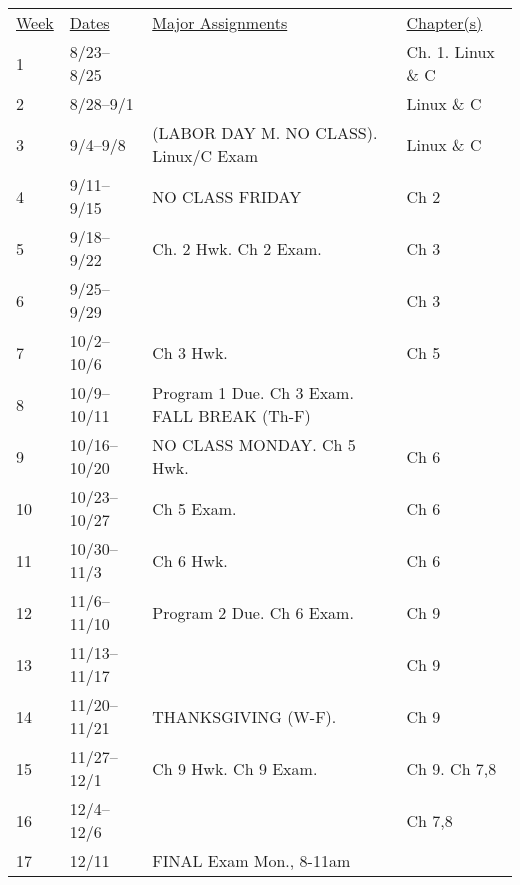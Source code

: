 \documentclass[10pt]{article}
\begin{document}
\begin{center}
\begin{tabular}{llll}
\underline{Week} & \underline{Dates} & \underline{Major Assignments} & \underline{Chapter(s)}\\
1 & 8/23--8/25  &  & Ch. 1. Linux \& C \\
2 & 8/28--9/1 &  &  Linux \& C \\
3 & 9/4--9/8 & (LABOR DAY M. NO CLASS). Linux/C Exam &  Linux \& C \\
4 & 9/11--9/15  & NO CLASS FRIDAY &  Ch 2 \\
5 & 9/18--9/22 & Ch. 2 Hwk. Ch 2 Exam. & Ch 3 \\
6 & 9/25--9/29 &  & Ch 3 \\
7 & 10/2--10/6 & Ch 3 Hwk. &  Ch 5 \\
8 & 10/9--10/11 & Program 1 Due. Ch 3 Exam. FALL BREAK (Th-F) & \\
9 & 10/16--10/20 & NO CLASS MONDAY. Ch 5 Hwk. &  Ch 6 \\
10 & 10/23--10/27  & Ch 5 Exam.  & Ch 6 \\
11 & 10/30--11/3 & Ch 6 Hwk. &  Ch 6 \\
12 & 11/6--11/10 & Program 2 Due. Ch 6 Exam.  & Ch 9 \\
13 & 11/13--11/17 &  & Ch 9 \\
14 & 11/20--11/21 & THANKSGIVING (W-F). & Ch 9 \\
15 & 11/27--12/1 & Ch 9 Hwk. Ch 9 Exam.  &  Ch 9. Ch 7,8 \\
16 & 12/4--12/6 & & Ch 7,8 \\
17 & 12/11 & FINAL Exam Mon., 8-11am & \\
\end{tabular}
\end{center}
\end{document}
